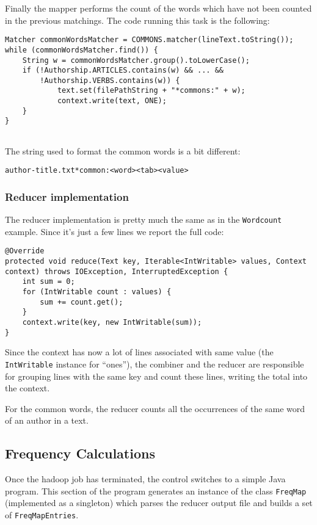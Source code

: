 \documentclass[a4paper,11pt, twoside]{article}
\begin{document}
	\noindent
	Finally the mapper performs the count of the words which have not been counted in the previous matchings. The code running this task is the following:
	\begin{lstlisting}[firstnumber=119, caption={Common words counting in the Map method.}, captionpos=b]
Matcher commonWordsMatcher = COMMONS.matcher(lineText.toString());
while (commonWordsMatcher.find()) {
	String w = commonWordsMatcher.group().toLowerCase();
	if (!Authorship.ARTICLES.contains(w) && ... &&
		!Authorship.VERBS.contains(w)) {
			text.set(filePathString + "*commons:" + w);
			context.write(text, ONE);
	}
}
		
	\end{lstlisting}
	
	\noindent
	The string used to format the common words is a bit different: 
	\begin{center}
		\texttt{author-title.txt*common:<word><tab><value>}
	\end{center}
	
	\subsubsection{Reducer implementation}
		The reducer implementation is pretty much the same as in the \lstinline|Wordcount| example. Since it's just a few lines we report the full code:
	\begin{lstlisting}[firstnumber=152, caption={Reduce method}, captionpos=b]
@Override
protected void reduce(Text key, Iterable<IntWritable> values, Context context) throws IOException, InterruptedException {
	int sum = 0;
	for (IntWritable count : values) {
		sum += count.get();
	}
	context.write(key, new IntWritable(sum));
}
	\end{lstlisting}
	
		\noindent
		Since the context has now a lot of lines associated with same value (the \lstinline|IntWritable| instance for ``ones''), the combiner and the reducer are responsible for grouping lines with the same key and count these lines, writing the total into the context.
		
		\noindent
		For the common words, the reducer counts all the occurrences of the same word of an author in a text.
	
	\subsection{Frequency Calculations}
		Once the hadoop job has terminated, the control switches to a simple Java program. This section of the program generates an instance of the class \lstinline|FreqMap| (implemented as a singleton) which parses the reducer output file and builds a set of \lstinline|FreqMapEntries|.
		
\end{document}
